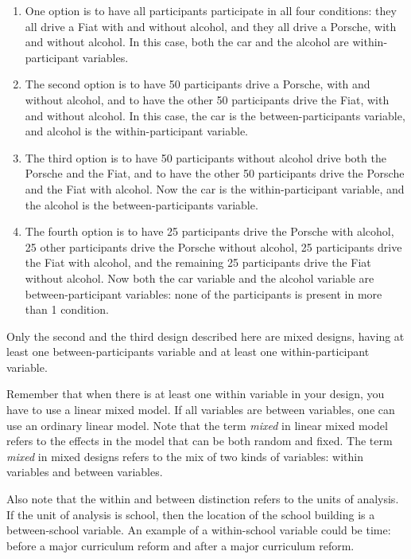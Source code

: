 \documentclass[]{book}\usepackage[]{graphicx}\usepackage[]{color}
\begin{document}
\begin{enumerate}


\item One option is to have all participants participate in all four conditions: they all drive a Fiat with and without alcohol, and they all drive a Porsche, with and without alcohol. In this case, both the car and the alcohol are within-participant variables.

\item The second option is to have 50 participants drive a Porsche, with and without alcohol, and to have the other 50 participants drive the Fiat, with and without alcohol. In this case, the car is the between-participants variable, and alcohol is the within-participant variable. 

\item The third option is to have 50 participants without alcohol drive both the Porsche and the Fiat, and to have the other 50 participants drive the Porsche and the Fiat with alcohol. Now the car is the within-participant variable, and the alcohol is the between-participants variable.

\item The fourth option is to have 25 participants drive the Porsche with alcohol, 25 other participants drive the Porsche without alcohol, 25 participants drive the Fiat with alcohol, and the remaining 25 participants drive the Fiat without alcohol. Now both the car variable and the alcohol variable are between-participant variables: none of the participants is present in more than 1 condition.

\end{enumerate}

Only the second and the third design described here are mixed designs, having at least one between-participants variable and at least one within-participant variable. 

Remember that when there is at least one within variable in your design, you have to use a linear mixed model. If all variables are between variables, one can use an ordinary linear model. Note that the term \textit{mixed} in linear mixed model refers to the effects in the model that can be both random and fixed. The term \textit{mixed} in mixed designs refers to the mix of two kinds of variables: within variables and between variables. 

Also note that the within and between distinction refers to the units of analysis. If the unit of analysis is school, then the location of the school building is a between-school variable. An example of a within-school variable could be time: before a major curriculum reform and after a major curriculum reform. 
\end{document}
